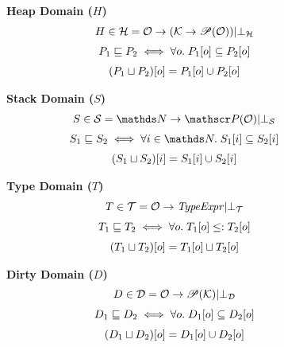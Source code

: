 \newcommand{\defeq}{\overset{\text{\tiny def}}{=}}

\begin{figure*}[t]
\centering

\begin{minipage}[t]{0.5\textwidth}
\centering
\textbf{Heap Domain ($H$)}
\begin{gather*}
H \in \mathcal{H} = \mathcal{O} \to (\mathcal{K} \to \mathscr{P}(\mathcal{O})) | \bot_\mathcal{H} \\[0.3em]
P_1 \sqsubseteq P_2 \iff \forall o.\; P_1[o] \subseteq P_2[o] \\[0.3em]
(P_1 \sqcup P_2)[o] = P_1[o] \cup P_2[o] \\
\end{gather*}
\end{minipage}%
\hfill
\begin{minipage}[t]{0.5\textwidth}
\centering
\textbf{Stack Domain ($S$)}
\begin{gather*}
S \in \mathcal{S} = \tN \to \powerset(\tO) | \bot_\mathcal{S} \\[0.3em]
S_1 \sqsubseteq S_2 \iff \forall i \in \tN.\; S_1[i] \subseteq S_2[i] \\[0.3em]
(S_1 \sqcup S_2)[i] = S_1[i] \cup S_2[i]
\end{gather*}
\end{minipage}

\vspace{1.5em}

\begin{minipage}[t]{0.5\textwidth}
\centering
\textbf{Type Domain ($T$)}
\begin{gather*}
T \in \mathcal{T} = \mathcal{O} \to \mathit{TypeExpr} | \bot_\mathcal{T} \\[0.3em]
T_1 \sqsubseteq T_2 \iff \forall o.\; T_1[o] \leq: T_2[o] \\[0.3em]
(T_1 \sqcup T_2)[o] = T_1[o] \sqcup T_2[o]
\end{gather*}
\end{minipage}%
\hfill
\begin{minipage}[t]{0.5\textwidth}
\centering
\textbf{Dirty Domain ($D$)}
\begin{gather*}
D \in \mathcal{D} = \mathcal{O} \to \mathscr{P}(\mathcal{K}) | \bot_\mathcal{D} \\[0.3em]
D_1 \sqsubseteq D_2 \iff \forall o.\; D_1[o] \subseteq D_2[o] \\[0.3em]
(D_1 \sqcup D_2)[o] = D_1[o] \cup D_2[o]
\end{gather*}
\end{minipage}


\end{figure*}
